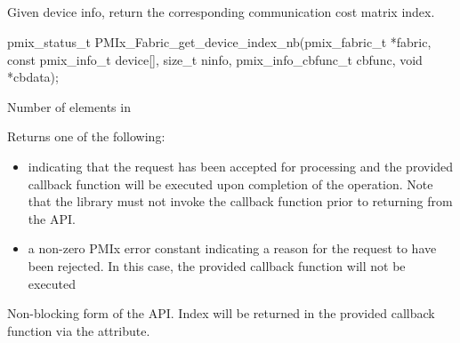 \subsection{}

\summary

Given device info, return the corresponding communication cost matrix index.

\format

\cspecificstart
\begin{codepar}
pmix_status_t
PMIx_Fabric_get_device_index_nb(pmix_fabric_t *fabric,
                                const pmix_info_t device[],
                                size_t ninfo,
                                pmix_info_cbfunc_t cbfunc,
                                void *cbdata);
\end{codepar}
\cspecificend

\begin{arglist}
 Number of elements in 
\end{arglist}

Returns one of the following:

\begin{itemize}
\item {} indicating that the request has been accepted for processing and the provided callback function will be executed upon completion of the operation. Note that the library must not invoke the callback function prior to returning from the \ac{API}.
\item a non-zero \ac{PMIx} error constant indicating a reason for the request to have been rejected. In this case, the provided callback function will not be executed
\end{itemize}


\descr

Non-blocking form of the  \ac{API}. Index will be returned in the provided callback function via the  attribute.

